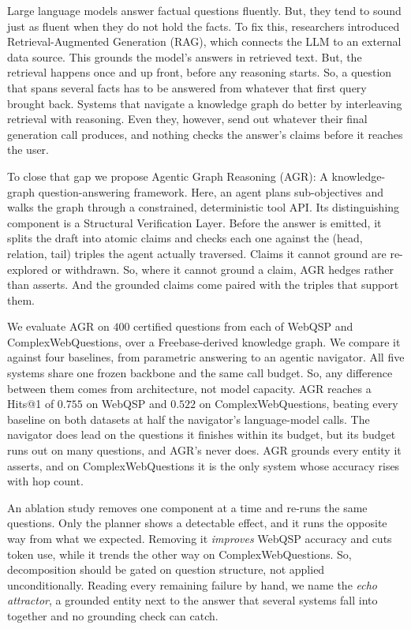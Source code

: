 %

Large language models answer factual questions fluently. But, they tend to sound
just as fluent when they do not hold the facts. To fix this, researchers
introduced Retrieval-Augmented Generation (RAG), which connects the LLM to an
external data source. This grounds the model's answers in retrieved text. But,
the retrieval happens once and up front, before any reasoning starts. So, a
question that spans several facts has to be answered from whatever that first
query brought back. Systems that navigate a knowledge graph do better by
interleaving retrieval with reasoning. Even they, however, send out whatever
their final generation call produces, and nothing checks the answer's claims
before it reaches the user.

To close that gap we propose Agentic Graph Reasoning (AGR): A knowledge-graph
question-answering framework. Here, an agent plans sub-objectives and walks the
graph through a constrained, deterministic tool API. Its distinguishing
component is a Structural Verification Layer. Before the answer is emitted, it
splits the draft into atomic claims and checks each one against the (head,
relation, tail) triples the agent actually traversed. Claims it cannot ground
are re-explored or withdrawn. So, where it cannot ground a claim, AGR hedges
rather than asserts. And the grounded claims come paired with the triples that
support them.

We evaluate AGR on $400$ certified questions from each of WebQSP and
ComplexWebQuestions, over a Freebase-derived knowledge graph. We compare it
against four baselines, from parametric answering to an agentic navigator. All
five systems share one frozen backbone and the same call budget. So, any
difference between them comes from architecture, not model capacity. AGR reaches
a Hits@1 of $0.755$ on WebQSP and $0.522$ on ComplexWebQuestions, beating every
baseline on both datasets at half the navigator's language-model calls. The
navigator does lead on the questions it finishes within its budget, but its
budget runs out on many questions, and AGR's never does. AGR grounds every
entity it asserts, and on ComplexWebQuestions it is the only system whose
accuracy rises with hop count.

An ablation study removes one component at a time and re-runs the same
questions. Only the planner shows a detectable effect, and it runs the opposite
way from what we expected. Removing it \emph{improves} WebQSP accuracy and cuts
token use, while it trends the other way on ComplexWebQuestions. So,
decomposition should be gated on question structure, not applied
unconditionally. Reading every remaining failure by hand, we name the \emph{echo
attractor}, a grounded entity next to the answer that several systems fall into
together and no grounding check can catch.

\endinput
